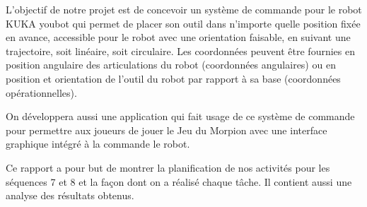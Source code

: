 

L'objectif de notre projet est de concevoir un système de commande pour le robot KUKA youbot qui permet de placer son outil dans n'importe quelle position fixée en avance, accessible pour le robot avec une orientation faisable, en suivant une trajectoire, soit linéaire, soit circulaire. Les coordonnées peuvent être fournies en position angulaire des articulations du robot (coordonnées angulaires) ou en position et orientation de l'outil du robot par rapport à sa base (coordonnées opérationnelles). 

On développera aussi une application qui fait usage de ce système de commande pour permettre aux joueurs de jouer le Jeu du Morpion avec une interface graphique intégré à la commande le robot.

Ce rapport a pour but de montrer la planification de nos activités pour les séquences 7 et 8 et la façon dont on a réalisé chaque tâche. Il contient aussi une analyse des résultats obtenus.\newpage